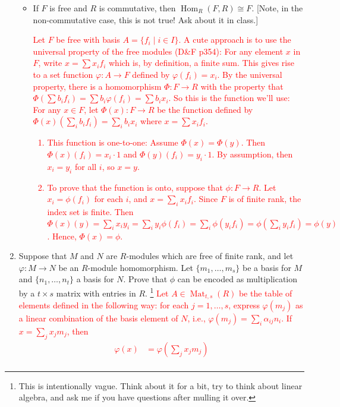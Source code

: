 \documentclass[12pt]{article}
\newcommand{\Hom}{\operatorname{Hom}}
\newcommand{\solution}[1]{\textcolor{red}{#1}}
\begin{document}
\begin{enumerate}
\begin{itemize}
{}
\item If $F$ is free and $R$ is commutative, then $\Hom_R(F,R)\cong
  F$. [Note, in the non-commutative case, this is not true! Ask about
  it in class.]
\solution{Let $F$ be free with basis $A=\{f_i \mid i\in I\}$. A cute
  approach is to use the universal property of the free modules (D\&F p354): For
  any element $x$ in $F$, write $x=\sum x_i f_i$ which is, by
  definition, a finite sum. This gives rise to a set function
  $\varphi: A\rightarrow F$ defined by $\varphi(f_i) = x_i$. By
  the universal property, there is a homomorphism $\Phi: F\rightarrow
  R$ with the property that $\Phi(\sum b_i f_i) = \sum b_i
  \varphi(f_i) = \sum b_i x_i$. So this is the function we'll
  use: For any $x\in F$, let $\Phi(x): F\rightarrow R$ be the function
  defined by $\Phi(x)(\sum_i b_i f_i) = \sum_i b_i x_i$ where $x=\sum
  x_i f_i$.
  \begin{enumerate}
  \item This function is one-to-one: Assume $\Phi(x)=\Phi(y)$. Then
    $\Phi(x)(f_i) = x_i \cdot 1$ and $\Phi(y)(f_i) = y_i\cdot 1$. By
    assumption, then $x_i = y_i$ for all $i$, so $x=y$. 
  \item To prove that the function is onto, suppose that $\phi: F
    \rightarrow R$. Let $x_i = \phi(f_i)$ for each $i$, and $x=\sum_i
    x_i f_i$. Since $F$ is of finite rank, the index set is
    finite. Then $\Phi(x)(y) = \sum_i x_i y_i = \sum_i y_i \phi(f_i) =
    \sum_i \phi(y_i f_i)= \phi(\sum_i y_i f_i) = \phi(y)$. Hence,
    $\Phi(x)=\phi$. 
  \end{enumerate}
}
\end{itemize}
\item Suppose that $M$ and
  $N$ are $R$-modules which are free of finite rank, and let $\varphi:
  M\rightarrow N$ be an $R$-module homomorphism. Let
  $\{m_1,\dotsc, m_s\}$ be a basis for $M$ and $\{n_1,\dotsc, n_t\}$ a
  basis for $N$. Prove that $\phi$ can be encoded as multiplication by
  a $t\times s$ matrix with entries in $R$. \footnote{This is
    intentionally vague. Think about it for a bit, try to think about
    linear algebra, and ask me if you have questions after mulling it
    over. }
\solution{
Let $A\in \operatorname{Mat}_{t,s}(R)$ be the table of elements defined in the following way: for
each $j=1,\dotsc, s$, express $\varphi(m_j)$ as a linear combination
of the basis element of $N$, i.e., $\varphi(m_j) = \sum_i \alpha_{ij}
n_i$. If $x=\sum_j x_j m_j$, then
\begin{align*}
  \varphi(x) &= \varphi(\sum_j x_j m_j)\\

\end{align*}}
\end{enumerate}
\end{document}
